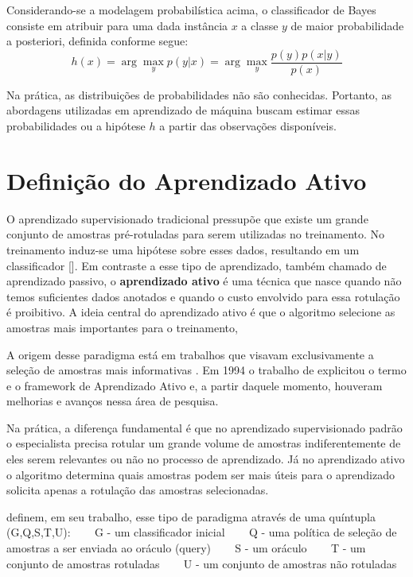 {Considerando-se a modelagem probabilística acima, o classificador de Bayes consiste em atribuir para uma dada instância $x$ a classe $y$ de maior probabilidade a posteriori, definida conforme segue:
\begin{equation}
  h(x) = \arg\max_y p(y|x) = \arg\max_y \frac{p(y) p(x|y)}{p(x)}
\end{equation}

Na prática, as distribuições de probabilidades não são conhecidas. Portanto, as abordagens utilizadas em aprendizado de máquina buscam estimar essas probabilidades ou a hipótese $h$ a partir das observações disponíveis.
}

\section{Definição do Aprendizado Ativo}
\label{sec:definicao}

O aprendizado supervisionado tradicional pressupõe que existe um grande conjunto de amostras pré-rotuladas para serem utilizadas no treinamento. No treinamento induz-se uma hipótese sobre esses dados, resultando em um classificador [\cite{settles2014active}]. Em contraste a esse tipo de aprendizado, também chamado de aprendizado passivo, o {\bf aprendizado ativo} é uma técnica que nasce quando não temos suficientes dados anotados e quando o custo envolvido para essa rotulação é proibitivo. A ideia central do aprendizado ativo é que o algoritmo selecione as amostras mais importantes para o treinamento,  


A origem desse paradigma está em trabalhos que visavam exclusivamente a seleção de amostras mais informativas  \citep{angluin1988queries, baum1992query, atlas1990training}. Em 1994 o trabalho de \citep{cohn1994improving} explicitou o termo e o framework de Aprendizado Ativo e, a partir daquele momento, houveram melhorias e avanços nessa área de pesquisa. 


Na prática, a diferença fundamental é que no aprendizado supervisionado padrão o especialista precisa rotular um grande volume de amostras indiferentemente de eles serem relevantes ou não no processo de aprendizado. Já no aprendizado ativo o algoritmo determina quais amostras podem ser mais úteis para o aprendizado  solicita apenas a rotulação das amostras selecionadas. 

\cite{persello2012active} definem, em seu trabalho, esse tipo de paradigma através de uma quíntupla (G,Q,S,T,U):
\newline
\newline
~~~ G - um classificador inicial 
\newline
~~~ Q - uma política de seleção de amostras a ser enviada ao oráculo (query)
\newline 
~~~ S - um oráculo
\newline 
~~~ T - um conjunto de amostras rotuladas
\newline 
~~~ U - um conjunto de amostras não rotuladas


